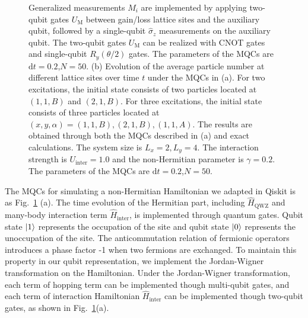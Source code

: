 \documentclass[longbibliography, aps, prx, amsmath, amssymb, amsfonts, twocolumn,superscriptaddress, footinbib]{revtex4-1}
\begin{document}
\begin{figure}[htbp]
{		Generalized measurements $M_i$ are implemented by applying two-qubit gates $U_{\text{M}}$ between gain/loss lattice sites and the auxiliary qubit, followed by a single-qubit $\hat{\sigma}_z$ measurements on the auxiliary qubit.
		The two-qubit gates $U_{\text{M}}$ can be realized with CNOT gates and single-qubit $R_y(\theta/2)$ gates. The parameters of the MQCs are $\mathrm{d}t=0.2$,$N=50$.
		(b) Evolution of the average particle number at different lattice sites over time $t$ under the MQCs in (a). 
		For two excitations, the initial state consists of two particles located at $(1,1,B)$ and $(2,1,B)$. For three excitations, the initial state consists of three particles located at $(x,y,\alpha)=(1,1,B), (2,1,B), (1,1,A)$.
		The results are obtained through both the MQCs described in (a) and exact calculations. The system size is $L_x=2,L_y=4$. The interaction strength is $U_{\text{inter}}=1.0$ and the non-Hermitian parameter is $\gamma=0.2$. The parameters of the MQCs are $\mathrm{d}t=0.2$,$N=50$.
		}
		\label{fig:04}
	\end{figure}
	The MQCs for simulating a non-Hermitian Hamiltonian we adapted in Qiskit is as Fig.~\ref{fig:04} (a). The time evolution of the Hermitian part, including $\hat{H}_{\text{QWZ}}$ and many-body interaction term $\hat{H}_{\text{inter}}$, is implemented through quantum gates. 
	Qubit state $\ket{1}$ represents the occupation of the site and qubit state $\ket{0}$ represents the unoccupation of the site. 
	The anticommutation relation of fermionic operators introduces a phase factor -1 when two fermions are exchanged. To maintain this property in our qubit representation, we implement the Jordan-Wigner transformation on the Hamiltonian.
	Under the Jordan-Wigner transformation, each term of hopping term can be implemented though multi-qubit gates, and each term of interaction Hamiltonian $\hat{H}_{\text{inter}}$ can be implemented though two-qubit gates, as shown in Fig.~\ref{fig:04}(a). 
\end{document}
